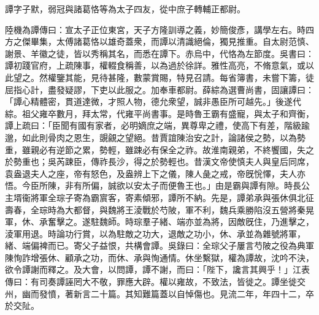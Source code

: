 
\begin{pinyinscope}
譚字子默，弱冠與諸葛恪等為太子四友，從中庶子轉輔正都尉。

陸機為譚傳曰：宣太子正位東宮，天子方隆訓導之義，妙簡俊彥，講學左右。時四方之傑畢集，太傅諸葛恪以雄奇蓋衆，而譚以清識絕倫，獨見推重。自太尉范慎、謝景、羊徽之徒，皆以秀稱其名，而悉在譚下。赤烏中，代恪為左節度。吳書曰：譚初踐官府，上疏陳事，權輟食稱善，以為過於徐詳。雅性高亮，不脩意氣，或以此望之。然權鑒其能，見待甚隆，數蒙賞賜，特見召請。每省簿書，未嘗下籌，徒屈指心計，盡發疑謬，下吏以此服之。加奉車都尉。薛綜為選曹尚書，固讓譚曰：「譚心精體密，貫道達微，才照人物，德允衆望，誠非愚臣所可越先。」後遂代綜。祖父雍卒數月，拜太常，代雍平尚書事。是時魯王霸有盛寵，與太子和齊衡，譚上疏曰：「臣聞有國有家者，必明嫡庶之端，異尊卑之禮，使高下有差，階級踰邈，如此則骨肉之恩生，覬覦之望絕。昔賈誼陳治安之計，論諸侯之勢，以為勢重，雖親必有逆節之累，勢輕，雖踈必有保全之祚。故淮南親弟，不終饗國，失之於勢重也；吳芮踈臣，傳祚長沙，得之於勢輕也。昔漢文帝使慎夫人與皇后同席，袁盎退夫人之座，帝有怒色，及盎辨上下之儀，陳人彘之戒，帝旣恱懌，夫人亦悟。今臣所陳，非有所偏，誠欲以安太子而便魯王也。」由是霸與譚有隙。時長公主壻衞將軍全琮子寄為霸賔客，寄素傾邪，譚所不納。先是，譚弟承與張休俱北征壽春，全琮時為大都督，與魏將王淩戰於芍陂，軍不利，魏兵乘勝陷沒五營將秦晃軍，休、承奮擊之。遂駐魏師。時琮羣子緒、端亦並為將，因敵旣住，乃進擊之，淩軍用退。時論功行賞，以為駐敵之功大，退敵之功小，休、承並為雜號將軍，緒、端偏裨而已。寄父子益恨，共構會譚。吳錄曰：全琮父子屢言芍陂之役為典軍陳恂詐增張休、顧承之功，而休、承與恂通情。休坐繫獄，權為譚故，沈吟不決，欲令譚謝而釋之。及大會，以問譚，譚不謝，而曰：「陛下，讒言其興乎！」江表傳曰：有司奏譚誣罔大不敬，罪應大辟。權以雍故，不致法，皆徙之。譚坐徙交州，幽而發憤，著新言二十篇。其知難篇蓋以自悼傷也。見流二年，年四十二，卒於交阯。


\end{pinyinscope}